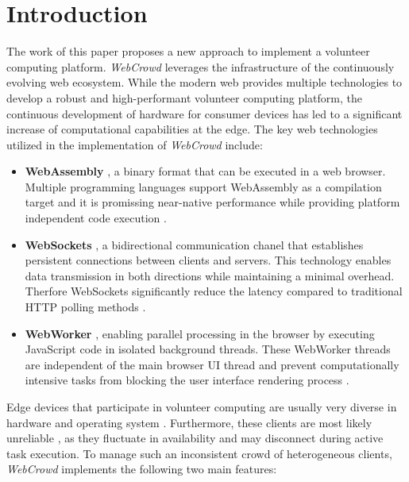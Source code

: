 \chapter{Introduction}
\label{ch:intro}
The work of this paper proposes a new approach to implement a volunteer computing platform. \emph{WebCrowd} leverages the infrastructure of the continuously evolving web ecosystem. While the modern web provides multiple technologies to develop a robust and high-performant volunteer computing platform, the continuous development of hardware for consumer devices has led to a significant increase of computational capabilities at the edge. The key web technologies utilized in the implementation of \emph{WebCrowd} include:
\begin{itemize}
    \item \textbf{WebAssembly} \cite{methodology:wasmdocu}, a binary format that can be executed in a web browser. Multiple programming languages support WebAssembly as a compilation target and it is promissing near-native performance while providing platform independent code execution \cite{methodology:wasm}.
    \item \textbf{WebSockets} \cite{methodology:websockets1}, a bidirectional communication chanel that establishes persistent connections between clients and servers. This technology enables data transmission in both directions while maintaining a minimal overhead. Therfore WebSockets significantly reduce the latency compared to traditional \acs{HTTP} polling methods \cite{methodology:websockets3}. 
    \item \textbf{WebWorker} \cite{methodology:webworkers}, enabling parallel processing in the browser by executing JavaScript code in isolated background threads. These WebWorker threads are independent of the main browser UI thread and prevent computationally intensive tasks from blocking the user interface rendering process \cite{methodology:webworkers}.
\end{itemize}
Edge devices that participate in volunteer computing are usually very diverse in hardware and operating system \cite{intro:diverseDevices}. Furthermore, these clients are most likely unreliable \cite{relatedwork:boinc1}, as they fluctuate in availability and may disconnect during active task execution. To manage such an inconsistent crowd of heterogeneous clients, \emph{WebCrowd} implements the following two main features:
